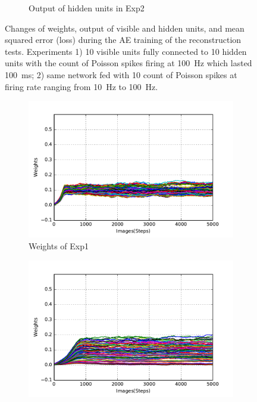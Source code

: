 \begin{figure}
\begin{subfigure}[t]{0.4\textwidth}
		\caption{Output of hidden units in Exp2}
	\end{subfigure}
	\caption{Changes of weights, output of visible and hidden units, and mean squared error (loss) during the AE training of the reconstruction tests. 
		Experiments 1) 10 visible units fully connected to 10 hidden units with the count of Poisson spikes firing at 100~Hz which lasted 100~ms; 2) same network fed with 10 count of Poisson spikes at firing rate ranging from 10~Hz to 100~Hz.}
	\label{fig:poisson_ae}
\end{figure}

\begin{figure}
	\centering
	\begin{subfigure}[t]{0.4\textwidth}
		\includegraphics[width=\textwidth]{pics_sdlm/31_exp_RBM_noise/exp1_weights_s.pdf}
		\caption{Weights of Exp1}
	\end{subfigure}
	\begin{subfigure}[t]{0.4\textwidth}
		\includegraphics[width=\textwidth]{pics_sdlm/31_exp_RBM_noise/exp2_weights_s.pdf}

\end{subfigure}
\end{figure}
